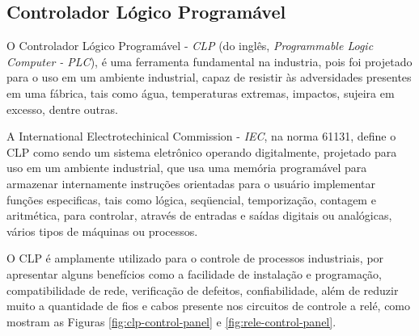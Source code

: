 \documentclass[a4paper, 12pt]{article}
\begin{document}
	\subsection{Controlador Lógico Programável}
	
		O Controlador Lógico Programável - \textit{CLP} (do inglês, \textit{Programmable Logic Computer - PLC}),
		é uma ferramenta fundamental na industria, pois foi projetado para o uso em um
		ambiente industrial, capaz de resistir às adversidades presentes em uma fábrica,
		tais como água, temperaturas extremas, impactos, sujeira em excesso, dentre outras.
		
		A International Electrotechinical Commission - \textit{IEC}, na norma 61131, define
		o CLP como sendo um sistema eletrônico operando digitalmente, projetado 
		para uso em um ambiente industrial, que usa uma  	memória programável para armazenar
		internamente instruções orientadas para o usuário implementar funções especificas,
		tais como lógica, seqüencial, temporização, contagem e aritmética, para controlar,
		através de entradas e saídas	digitais ou analógicas, vários tipos de máquinas ou 
		processos.
	
		O CLP é amplamente utilizado para o controle de processos industriais, por apresentar
		alguns benefícios como a facilidade de instalação e programação, compatibilidade de rede,
		verificação de defeitos, confiabilidade, além de reduzir muito a quantidade de fios e cabos
		presente nos circuitos de controle a relé, como mostram as Figuras \ref{fig:clp-control-panel} e \ref{fig:rele-control-panel}.
		
\end{document}
